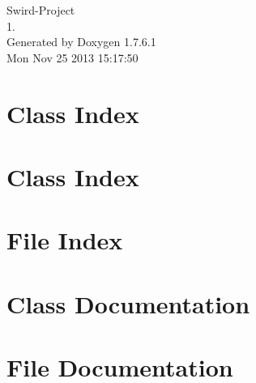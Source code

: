 \documentclass[a4paper]{book}
\begin{document}
\begin{titlepage}
\vspace*{7cm}
\begin{center}
{\Large \-Swird-\/\-Project \\[1ex]\large 1. }\\
\vspace*{1cm}
{\large \-Generated by Doxygen 1.7.6.1}\\
\vspace*{0.5cm}
{\small Mon Nov 25 2013 15:17:50}\\
\end{center}
\end{titlepage}
\clearemptydoublepage
{}
\tableofcontents
\clearemptydoublepage
{}
\chapter{\-Class \-Index}

\chapter{\-Class \-Index}

\chapter{\-File \-Index}

\chapter{\-Class \-Documentation}














\chapter{\-File \-Documentation}




























\printindex
\end{document}
